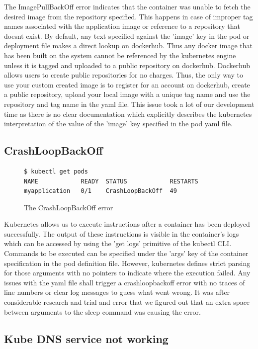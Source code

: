 \documentclass[9pt,twocolumn,twoside]{../../styles/osajnl}
\begin{document}
{The ImagePullBackOff error indicates that the container was unable to
fetch the desired image from the repository specified. This happens in
case of improper tag names associated with the application image or
reference to a repository that doesnt exist. By default, any text
specified against the 'image' key in the pod or deployment file makes
a direct lookup on dockerhub. Thus any docker image that has been
built on the system cannot be referenced by the kubernetes engine
unless it is tagged and uploaded to a public repository on
dockerhub. Dockerhub allows users to create public repositories for no
charges. Thus, the only way to use your custom created image is to
register for an account on dockerhub, create a public repository,
upload your local image with a unique tag name and use the repository
and tag name in the yaml file. This issue took a lot of our
development time as there is no clear documentation which explicitly
describes the kubernetes interpretation of the value of the 'image'
key specified in the pod yaml file.

\subsection{CrashLoopBackOff}
\begin{figure}[H]
\begin{verbatim}
$ kubectl get pods
NAME            READY  STATUS            RESTARTS  
myapplication   0/1    CrashLoopBackOff  49
\end{verbatim}
\caption{The CrashLoopBackOff error}
\vspace{-3mm}
\label{The CrashLoopBackOff error}
\end{figure}
Kubernetes allows us to execute instructions after a container has
been deployed successfully. The output of these instructions is
visible in the container's logs which can be accessed by using the
'get logs' primitive of the kubectl CLI. Commands to be executed can
be specified under the 'args' key of the container specification in
the pod definition file. However, kubernetes defines strict parsing
for those arguments with no pointers to indicate where the execution
failed. Any issues with the yaml file shall trigger a crashloopbackoff
error with no traces of line numbers or clear log messages to guess
what went wrong. It was after considerable research and trial and
error that we figured out that an extra space between arguments to the
sleep command was causing the error.


\subsection{Kube DNS service not working}

}
\end{document}
